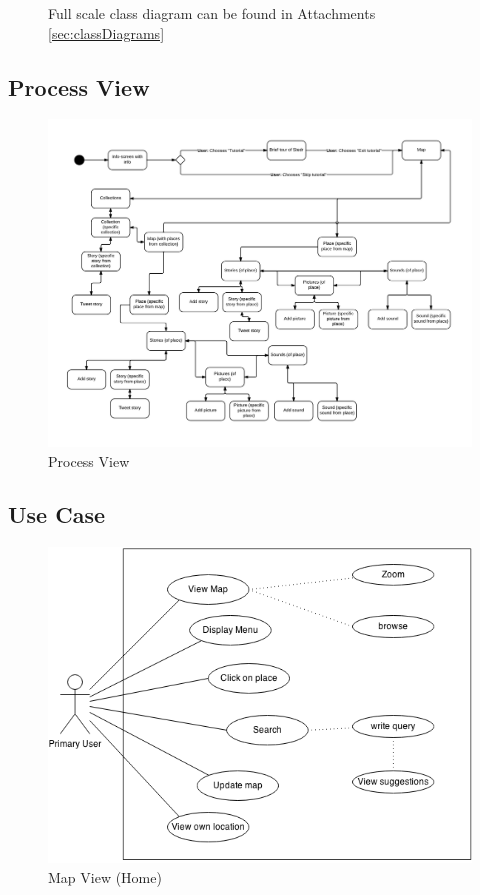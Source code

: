 \begin{figure}[!h]
\begin{center}
\begin{tabular}{cc}
\end{tabular}
\caption[miniature class diagram: front-end]{Full scale class diagram can be found in Attachments \ref{sec:classDiagrams}}
\end{center}
\end{figure}

\subsection{Process View}

\begin{figure}[!h]
\begin{center}
\includegraphics[width=1\textwidth]{res/processView.pdf}
\caption{Process View}
\end{center}
\end{figure}


\subsection{Use Case}

\begin{figure}[!h]
\begin{center}
\includegraphics[scale=0.6]{ms.png}
\caption{Map View (Home)}
\end{center}
\end{figure}

